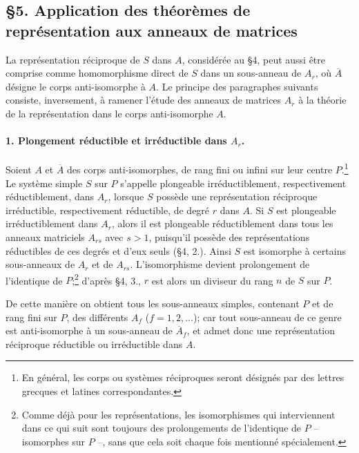 \providecommand{\frM}{\mathfrak M}

\subsection*{\S 5. Application des théorèmes de représentation aux anneaux de matrices}

La représentation réciproque de \(S\) dans \(A\), considérée au \S 4, peut aussi être comprise comme homomorphisme direct de \(S\) dans un sous-anneau de \(A_r\), où \(\overline A\) désigne le corps anti-isomorphe à \(A\). Le principe des paragraphes suivants consiste, inversement, à ramener l'étude des anneaux de matrices \(A_r\) à la théorie de la représentation dans le corps anti-isomorphe \(A\).

\paragraph{1. Plongement réductible et irréductible dans \(A_r\).}
Soient \(A\) et \(\overline A\) des corps anti-isomorphes, de rang fini ou infini sur leur centre \(P\).\footnote{En général, les corps ou systèmes réciproques seront désignés par des lettres grecques et latines correspondantes.} Le système simple \(S\) sur \(P\) s'appelle plongeable irréductiblement, respectivement réductiblement, dans \(A_r\), lorsque \(S\) possède une représentation réciproque irréductible, respectivement réductible, de degré \(r\) dans \(A\). Si \(S\) est plongeable irréductiblement dans \(A_r\), alors il est plongeable réductiblement dans tous les anneaux matriciels \(A_{rs}\) avec \(s>1\), puisqu'il possède des représentations réductibles de ces degrés et d'eux seuls (\S 4, 2.). Ainsi \(S\) est isomorphe à certains sous-anneaux de \(A_r\) et de \(A_{rs}\). L'isomorphisme devient prolongement de l'identique de \(P\);\footnote{Comme déjà pour les représentations, les isomorphismes qui interviennent dans ce qui suit sont toujours des prolongements de l'identique de \(P\) -- isomorphes sur \(P\) --, sans que cela soit chaque fois mentionné spécialement.} d'après \S 4, 3., \(r\) est alors un diviseur du rang \(n\) de \(S\) sur \(P\).

De cette manière on obtient tous les sous-anneaux simples, contenant \(P\) et de rang fini sur \(P\), des différents \(A_f\) (\(f=1,2,\ldots\)); car tout sous-anneau de ce genre est anti-isomorphe à un sous-anneau de \(\overline A_f\), et admet donc une représentation réciproque réductible ou irréductible dans \(A\).

